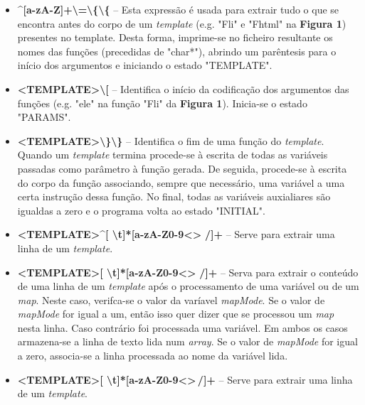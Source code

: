 \documentclass{article}
\begin{document}
\begin{itemize}
    \item \textbf{\^{}[a-zA-Z]+\textbackslash{}=\textbackslash{}\{\textbackslash{}\{} -- Esta expressão é usada para extrair tudo o que se encontra antes do corpo de um \emph{template} (e.g. "Fli" e "Fhtml" na \textbf{Figura 1}) presentes no template. Desta forma, imprime-se no ficheiro resultante os nomes das funções (precedidas de "char*"), abrindo um parêntesis para o início dos argumentos e iniciando o estado "TEMPLATE".
    
    \item \textbf{\textless TEMPLATE\textgreater\textbackslash{}[} -- Identifica o início da codificação dos argumentos das funções (e.g. "ele" na função "Fli" da \textbf{Figura 1}). Inicia-se o estado "PARAMS".
    
    \item \textbf{\textless TEMPLATE\textgreater\textbackslash{}\}\textbackslash{}\}} -- Identifica o fim de uma função do \emph{template}. Quando um \emph{template} termina procede-se à escrita de todas as variáveis passadas como parâmetro à função gerada. De seguida, procede-se à escrita do corpo da função associando, sempre que necessário, uma variável a uma certa instrução dessa função. No final, todas as variáveis auxialiares são igualdas a zero e o programa volta ao estado "INITIAL".
    
    \item \textbf{\textless TEMPLATE\textgreater\^{}[ \textbackslash{}t]*[a-zA-Z0-9\textless\textgreater\,\,/]+} -- Serve para extrair uma linha de um \emph{template}.
    
    \item \textbf{\textless TEMPLATE\textgreater[ \textbackslash{}t]*[a-zA-Z0-9\textless\textgreater\,\,/]+\textdollar{}} -- Serva para extrair o conteúdo de uma linha de um \emph{template} após o processamento de uma variável ou de um \emph{map}. Neste caso, verifca-se o valor da varíavel \emph{mapMode}. Se o valor de \emph{mapMode} for igual a um, então isso quer dizer que se processou um \emph{map} nesta linha. Caso contrário foi processada uma variável. Em ambos os casos armazena-se a linha de texto lida num \emph{array}. Se o valor de \emph{mapMode} for igual a zero, associa-se a linha processada ao nome da variável lida. 
    
    \item \textbf{\textless TEMPLATE\textgreater[ \textbackslash{}t]*[a-zA-Z0-9\textless\textgreater\,/]+} -- Serve para extrair uma linha de um \emph{template}.
    

\end{itemize}
\end{document}

